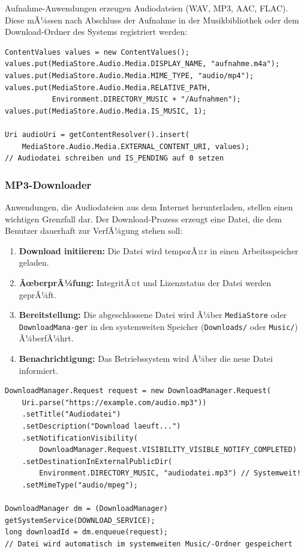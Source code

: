 ﻿\documentclass[12pt, a4paper]{article}
\begin{document}
Aufnahme-Anwendungen erzeugen Audiodateien (WAV, MP3, AAC, FLAC). Diese mÃ¼ssen
nach Abschluss der Aufnahme in der Musikbibliothek oder dem Download-Ordner des
Systems registriert werden:

\begin{lstlisting}[style=android, caption={Audioaufnahme dem System bereitstellen}]
ContentValues values = new ContentValues();
values.put(MediaStore.Audio.Media.DISPLAY_NAME, "aufnahme.m4a");
values.put(MediaStore.Audio.Media.MIME_TYPE, "audio/mp4");
values.put(MediaStore.Audio.Media.RELATIVE_PATH,
           Environment.DIRECTORY_MUSIC + "/Aufnahmen");
values.put(MediaStore.Audio.Media.IS_MUSIC, 1);

Uri audioUri = getContentResolver().insert(
    MediaStore.Audio.Media.EXTERNAL_CONTENT_URI, values);
// Audiodatei schreiben und IS_PENDING auf 0 setzen
\end{lstlisting}

\subsubsection{MP3-Downloader}

Anwendungen, die Audiodateien aus dem Internet herunterladen, stellen einen wichtigen
Grenzfall dar. Der Download-Prozess erzeugt eine Datei, die dem Benutzer dauerhaft
zur VerfÃ¼gung stehen soll:

\begin{enumerate}[label=\textbf{\arabic*:}]
  \item \textbf{Download initiieren:} Die Datei wird temporÃ¤r in einen Arbeitsspeicher
    geladen.
  \item \textbf{ÃœberprÃ¼fung:} IntegritÃ¤t und Lizenzstatus der Datei werden geprÃ¼ft.
  \item \textbf{Bereitstellung:} Die abgeschlossene Datei wird Ã¼ber \texttt{MediaStore}
    oder \texttt{DownloadMana-\newline ger} in den systemweiten Speicher (\texttt{Downloads/}
    oder \texttt{Music/}) Ã¼berfÃ¼hrt.
  \item \textbf{Benachrichtigung:} Das Betriebssystem wird Ã¼ber die neue Datei
    informiert.
\end{enumerate}

\begin{lstlisting}[style=android, caption={Systemkonformer Datei-Download per DownloadManager}]
DownloadManager.Request request = new DownloadManager.Request(
    Uri.parse("https://example.com/audio.mp3"))
    .setTitle("Audiodatei")
    .setDescription("Download laeuft...")
    .setNotificationVisibility(
        DownloadManager.Request.VISIBILITY_VISIBLE_NOTIFY_COMPLETED)
    .setDestinationInExternalPublicDir(
        Environment.DIRECTORY_MUSIC, "audiodatei.mp3") // Systemweit!
    .setMimeType("audio/mpeg");

DownloadManager dm = (DownloadManager) getSystemService(DOWNLOAD_SERVICE);
long downloadId = dm.enqueue(request);
// Datei wird automatisch im systemweiten Music/-Ordner gespeichert
\end{lstlisting}
\end{document}
